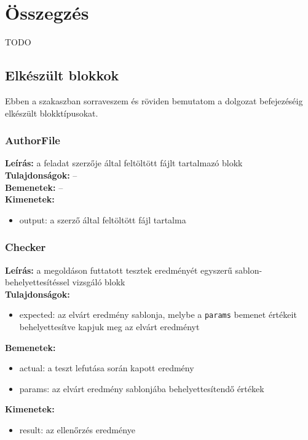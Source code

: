 \section{Összegzés}
TODO

\subsection{Elkészült blokkok}
Ebben a szakaszban sorraveszem és röviden bemutatom a dolgozat befejezéséig elkészült blokktípusokat.

\subsubsection{AuthorFile}
\textbf{Leírás:} a feladat szerzője által feltöltött fájlt tartalmazó blokk \\
\textbf{Tulajdonságok:} -- \\
\textbf{Bemenetek:} -- \\
\textbf{Kimenetek:}
\begin{itemize}
    \item output: a szerző által feltöltött fájl tartalma
\end{itemize}
        
\subsubsection{Checker}
\textbf{Leírás:} a megoldáson futtatott tesztek eredményét egyszerű sablon-behelyettesítéssel vizsgáló blokk \\
\textbf{Tulajdonságok:}
\begin{itemize}
    \item expected: az elvárt eredmény sablonja, melybe a \texttt{params} bemenet értékeit behelyettesítve kapjuk meg az elvárt eredményt
\end{itemize}
\textbf{Bemenetek:}
\begin{itemize}
    \item actual: a teszt lefutása során kapott eredmény
    \item params: az elvárt eredmény sablonjába behelyettesítendő értékek
\end{itemize}
\textbf{Kimenetek:}
\begin{itemize}
    \item result: az ellenőrzés eredménye
\end{itemize}

